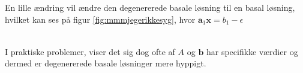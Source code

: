 En lille ændring vil ændre den degenererede basale løsning til en basal løsning, hvilket kan ses på figur \ref{fig:mmmjegerikkesyg}, hvor $\mathbf{a}_1 \mathbf{x} = b_1 - \epsilon$
%
%
\begin{center}
$
\begin{array}{cc}
&

\end{array}
$
\end{center}
%
%
I praktiske problemer, viser det sig dog ofte af $A$ og $\mathbf{b}$ har specifikke værdier og dermed er degenererede basale løsninger mere hyppigt.
%